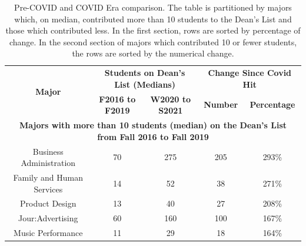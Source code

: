 \documentclass[10]{article}
\begin{document}
\small
\begin{longtable}[c]{|ccccc|}
	\caption{Pre-COVID and COVID Era comparison. The table is partitioned by majors which, on median, contributed more than 10 students to the Dean's List and those which contributed less.  In the first section, rows are sorted by percentage of change. In the second section of majors which contributed 10 or fewer students, the rows are sorted by the numerical change.}
	\label{tab:pre-post-covid}\\
	\hline
	\multicolumn{1}{|c|}{\multirow{2}{*}{\textbf{Major}}}            & \multicolumn{2}{c|}{\textbf{Students on Dean's List (Medians)}}                                                 & \multicolumn{2}{c|}{\textbf{Change Since Covid Hit}} \\ \cline{2-5} 
	\multicolumn{1}{|c|}{}                                           & \multicolumn{1}{c|}{\textbf{F2016 to F2019}} & \multicolumn{1}{c|}{\textbf{W2020 to S2021}} & \multicolumn{1}{c|}{\textbf{Number}}    & \textbf{Percentage}   \\ \hline
	\endhead
	\multicolumn{5}{|c|}{\textbf{Majors with more than 10 students (median) on the Dean's List from Fall 2016 to Fall 2019}}                                                                                                                             \\ \hline
	\multicolumn{1}{|c|}{Business Administration}                    & \multicolumn{1}{c|}{70}                              & \multicolumn{1}{c|}{275}                                 & \multicolumn{1}{c|}{205}                & 293\%                 \\ \hline
	\multicolumn{1}{|c|}{Family and Human Services}                  & \multicolumn{1}{c|}{14}                              & \multicolumn{1}{c|}{52}                                  & \multicolumn{1}{c|}{38}                 & 271\%                 \\ \hline
	\multicolumn{1}{|c|}{Product Design}                             & \multicolumn{1}{c|}{13}                              & \multicolumn{1}{c|}{40}                                  & \multicolumn{1}{c|}{27}                 & 208\%                 \\ \hline
	\multicolumn{1}{|c|}{Jour:Advertising}                           & \multicolumn{1}{c|}{60}                              & \multicolumn{1}{c|}{160}                                 & \multicolumn{1}{c|}{100}                & 167\%                 \\ \hline
	\multicolumn{1}{|c|}{Music Performance}                          & \multicolumn{1}{c|}{11}                              & \multicolumn{1}{c|}{29}                                  & \multicolumn{1}{c|}{18}                 & 164\%                 \\ \hline

\end{longtable}
\end{document}
